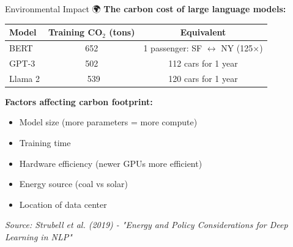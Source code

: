 \documentclass[aspectratio=169]{beamer}
\begin{document}
\begin{frame}{Environmental Impact 🌍}
\textbf{The carbon cost of large language models:}

\vspace{0.5em}

\begin{table}
\small
\begin{tabular}{l c c}
\toprule
\textbf{Model} & \textbf{Training CO$_2$ (tons)} & \textbf{Equivalent} \\
\midrule
BERT & 652 & 1 passenger: SF $\leftrightarrow$ NY (125×) \\
GPT-3 & 502 & 112 cars for 1 year \\
Llama 2 & ~539 & 120 cars for 1 year \\
\bottomrule
\end{tabular}
\end{table}

\vspace{0.5em}

\textbf{Factors affecting carbon footprint:}
\begin{itemize}\setlength{\itemsep}{0pt}
    \item Model size (more parameters = more compute)
    \item Training time
    \item Hardware efficiency (newer GPUs more efficient)
    \item Energy source (coal vs solar)
    \item Location of data center
\end{itemize}

\vspace{0.5em}

\small
\textit{Source: Strubell et al. (2019) - "Energy and Policy Considerations for Deep Learning in NLP"}
\end{frame}
\end{document}
